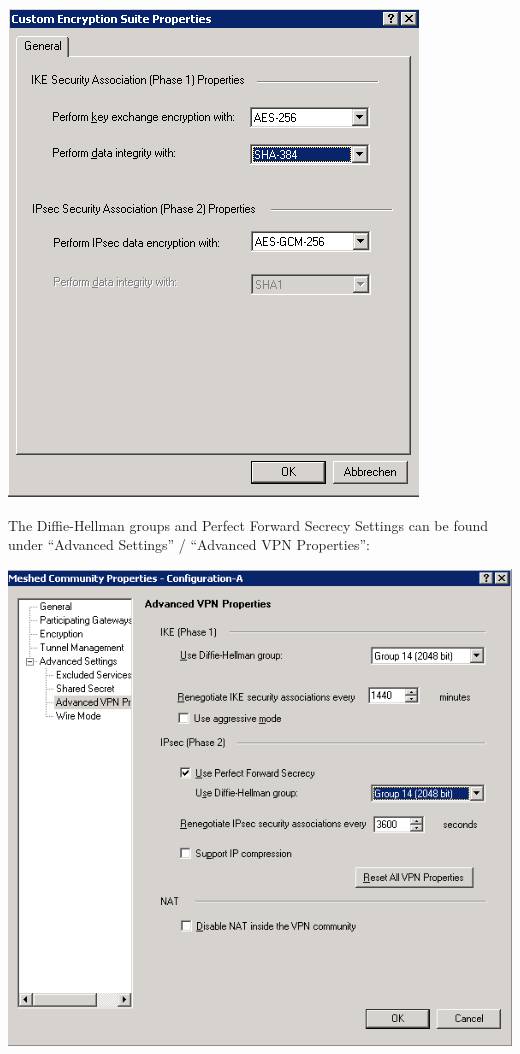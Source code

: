 \begin{description}
\includegraphics{checkpoint_2.png}

The Diffie-Hellman groups and Perfect Forward Secrecy Settings can be
found under ``Advanced Settings'' / ``Advanced VPN Properties'':

\includegraphics{checkpoint_3.png}


\end{description}
